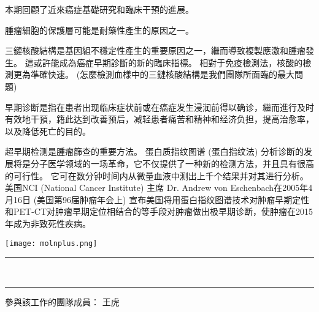 \documentclass[10pt,a4paper]{article}
\newcommand{\HorRule}[1]{\noindent\rule{\linewidth}{#1}} %
\begin{document}
\begin{multicols}{2}
本期回顧了近來癌症基礎研究和臨床干預的進展。

腫瘤細胞的保護層可能是耐藥性產生的原因之一。

三鏈核酸結構是基因組不穩定性產生的重要原因之一，繼而導致複製應激和腫瘤發生。
這或許能成為癌症早期診斷的新的臨床指標。
相對于免疫檢測法，核酸的檢測更為準確快速。
(怎麼檢測血樣中的三鏈核酸結構是我們團隊所面臨的最大問題)

早期诊断是指在患者出现临床症状前或在癌症发生浸润前得以确诊，繼而進行及时有效地干預，籍此达到改善预后，减轻患者痛苦和精神和经济负担，提高治愈率，以及降低死亡的目的。

超早期检测是腫瘤篩查的重要方法。
蛋白质指纹图谱 (蛋白指纹法) 分析诊断的发展将是分子医学领域的一场革命，它不仅提供了一种新的检测方法，并且具有很高的可行性。
它可在数分钟时间内从微量血液中测出上千个结果并对其进行分析。
美国NCI (National Cancer Institute) 主席 Dr. Andrew von Eschenbach在2005年4月16日 (美国第96届肿瘤年会上) 宣布美国将用蛋白指纹图谱技术对肿瘤早期定性和PET-CT对肿瘤早期定位相结合的等手段对肿瘤做出极早期诊断，使肿瘤在2015年成为非致死性疾病。


\begin{center}
\texttt{[image: molnplus.png]} %
\end{center}

\end{multicols}


\begin{center}

\noindent\HorRule{3pt} \\[-0.75\baselineskip] %
\HorRule{1pt} %

參與該工作的團隊成員：
王虎
\end{center}

\newpage



\end{document}
